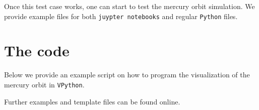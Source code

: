 \documentclass[12pt, UK english]{iopart}
\newcommand{\python}[0]{\texttt{Python}}
\newcommand{\vpython}[0]{\texttt{VPython}}
\begin{document}
Once this test case works, one can start to test the mercury orbit simulation.
We provide example files for both \texttt{juypter notebooks} and regular \python{} files.




\clearpage
\section{The code}\label{sec:code}
Below we provide an example script on how to program the visualization of the mercury orbit in \vpython{}.

Further examples and template files can be found online\cite{}.




%
%
\end{document}
